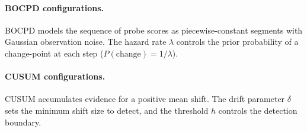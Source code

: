 \paragraph{BOCPD configurations.} BOCPD models the sequence of probe scores as piecewise-constant segments with Gaussian observation noise. The hazard rate $\lambda$ controls the prior probability of a change-point at each step ($P(\text{change}) = 1/\lambda$).

\paragraph{CUSUM configurations.} CUSUM accumulates evidence for a positive mean shift. The drift parameter $\delta$ sets the minimum shift size to detect, and the threshold $h$ controls the detection boundary.

\begin{table}[htbp]
\centering
\small
\caption{Change-point method configuration sweep on R1-8B. Detection rate is the fraction of jailbreak traces where the method fires. Lead is measured in steps before CP.}
\label{tab:cpd_sweep}
\setlength{\tabcolsep}{4pt}
\end{table}

